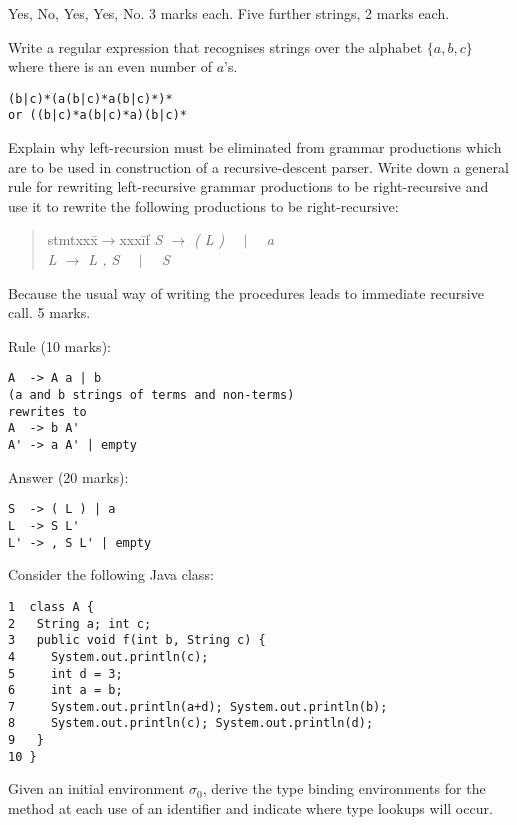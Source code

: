 \documentclass[11pt]{bareexam}
\begin{document}
\begin{questions}
\begin{subquestions}
\begin{modelanswer}
Yes, No, Yes, Yes, No. 3 marks each. 
Five further strings, 2 marks each.
\end{modelanswer}

\subquestion

Write a regular expression that recognises strings over the alphabet $\{a,b,c\}$ 
where there is an even number of $a$'s.

\begin{modelanswer}
\begin{verbatim}
(b|c)*(a(b|c)*a(b|c)*)*
or ((b|c)*a(b|c)*a)(b|c)*
\end{verbatim}
\end{modelanswer}

\subquestion

Explain why left-recursion must be eliminated from
grammar productions which are to be used in
construction of a recursive-descent parser.
Write down a general rule for rewriting left-recursive
grammar productions to be right-recursive and use it to 
rewrite the following productions to be right-recursive:
\begin{quote}
\begin{tabbing}
stmtxxx\=$\rightarrow$xxx\=if\kill
\it
S \> $\rightarrow$ \> ( {\it L\/} ) \ \  $\mid$ \ \  {\it a} \\
\it
L    \> $\rightarrow$ \> {\it L\/} , {\it S\/} \ \  $\mid$ \ \  {\it S} \\
\end{tabbing}
\end{quote}
\vspace{-1em}

\begin{modelanswer}
Because the usual way of writing the 
procedures leads to immediate recursive call. 5 marks.

Rule (10 marks):
\begin{verbatim}
A  -> A a | b
(a and b strings of terms and non-terms)
rewrites to 
A  -> b A'
A' -> a A' | empty
\end{verbatim}
Answer (20 marks):
\begin{verbatim}
S  -> ( L ) | a
L  -> S L'
L' -> , S L' | empty
\end{verbatim}
\end{modelanswer}

\subquestion
Consider the following Java class:
\begin{verbatim}
1  class A {
2   String a; int c;
3   public void f(int b, String c) {
4     System.out.println(c);
5     int d = 3;
6     int a = b;
7     System.out.println(a+d); System.out.println(b);
8     System.out.println(c); System.out.println(d);
9   }
10 }
\end{verbatim}
Given an initial environment $\sigma_0$, 
derive the type binding environments for the method at each
use of an identifier and indicate where type lookups will occur.


\end{subquestions}
\end{questions}
\end{document}
